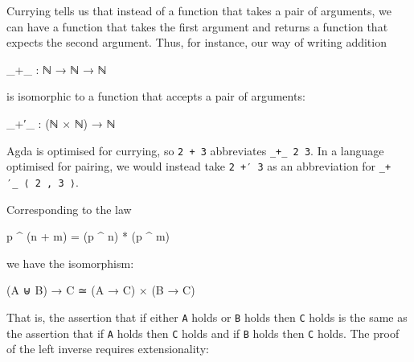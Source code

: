 Currying tells us that instead of a function that takes a pair of
arguments, we can have a function that takes the first argument and
returns a function that expects the second argument. Thus, for instance,
our way of writing addition

\begin{myDisplay}
_+_ : ℕ → ℕ → ℕ
\end{myDisplay}

is isomorphic to a function that accepts a pair of arguments:

\begin{myDisplay}
_+′_ : (ℕ × ℕ) → ℕ
\end{myDisplay}

Agda is optimised for currying, so \texttt{2\ +\ 3} abbreviates
\texttt{\_+\_\ 2\ 3}. In a language optimised for pairing, we would
instead take \texttt{2\ +′\ 3} as an abbreviation for
\texttt{\_+′\_\ ⟨\ 2\ ,\ 3\ ⟩}.

Corresponding to the law

\begin{myDisplay}
p ^ (n + m) = (p ^ n) * (p ^ m)
\end{myDisplay}

we have the isomorphism:

\begin{myDisplay}
(A ⊎ B) → C  ≃  (A → C) × (B → C)
\end{myDisplay}

That is, the assertion that if either \texttt{A} holds or \texttt{B}
holds then \texttt{C} holds is the same as the assertion that if
\texttt{A} holds then \texttt{C} holds and if \texttt{B} holds then
\texttt{C} holds. The proof of the left inverse requires extensionality:


